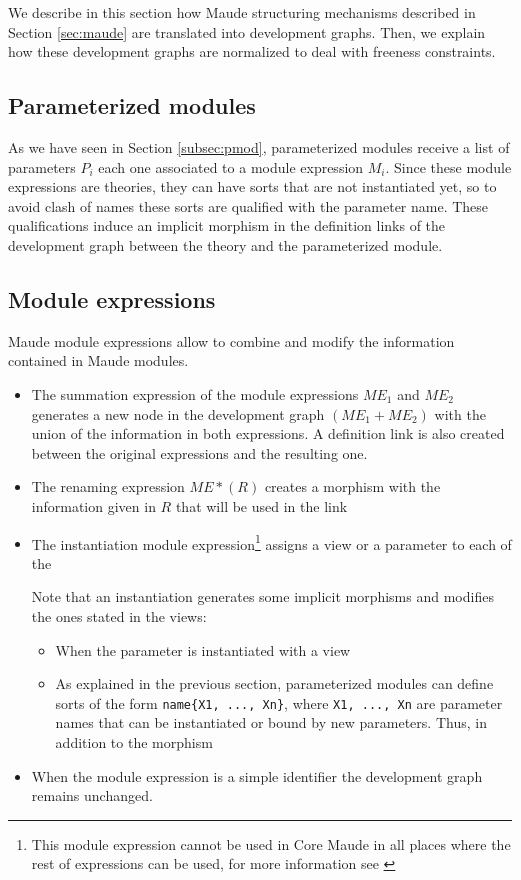 
We describe in this section how Maude structuring mechanisms
described in Section \ref{sec:maude}
are translated into development graphs. Then, we explain how these development
graphs are normalized to deal with freeness constraints.

\subsection{Parameterized modules}

As we have seen in Section \ref{subsec:pmod}, parameterized modules 
receive a list of parameters $P_i$ each one associated to a module
expression $M_i$. Since these module expressions are theories, they
can have sorts that are not instantiated yet, so to avoid clash of
names these sorts are qualified with the parameter name. These
qualifications induce an implicit morphism in the definition links
of the development graph between the theory and the parameterized
module.

\subsection{Module expressions}\label{subsec:me}

Maude module expressions allow to combine and modify the information
contained in Maude modules.

\begin{itemize}
\item The summation expression of the module expressions $\mathit{ME}_1$ and
$\mathit{ME}_2$ generates a new node in the development graph
$(\mathit{ME}_1 + \mathit{ME}_2)$ with
the union of the information in both expressions. A definition link
is also created between the original expressions and the resulting one.
\item The renaming expression $\mathit{ME} * (R)$ creates a morphism with
the information given in $R$ that will be used in the link 
\item The instantiation module expression\footnote{This module expression
cannot be used in Core Maude in all places where the rest of expressions
can be used, for more information see \cite{maude-book}} assigns a view
or a parameter to each of the

Note that an instantiation generates some implicit morphisms and modifies
the ones stated in the views:
\begin{itemize}
\item When the parameter is instantiated with a view
\item As explained in the previous section, parameterized modules can
define sorts of the form \verb"name{X1, ..., Xn}", where \verb"X1, ..., Xn"
are parameter names that can be instantiated or bound by new parameters.
Thus, in addition to the morphism
\end{itemize}

\item When the module expression is a simple identifier the development
graph remains unchanged.
\end{itemize}

